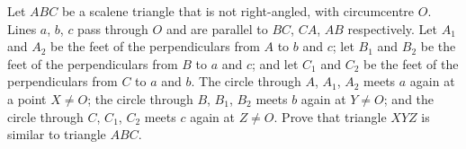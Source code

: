 Let $ABC$ be a scalene triangle that is not right-angled, with circumcentre $O$. Lines $a$, $b$, $c$ pass through $O$ and are parallel to $BC$, $CA$, $AB$ respectively. Let $A_1$ and $A_2$ be the feet of the perpendiculars from $A$ to $b$ and $c$; let $B_1$ and $B_2$ be the feet of the perpendiculars from $B$ to $a$ and $c$; and let $C_1$ and $C_2$ be the feet of the perpendiculars from $C$ to $a$ and $b$. The circle through $A$, $A_1$, $A_2$ meets $a$ again at a point $X\ne O$; the circle through $B$, $B_1$, $B_2$ meets $b$ again at $Y\ne O$; and the circle through $C$, $C_1$, $C_2$ meets $c$ again at $Z\ne O$. Prove that triangle $XYZ$ is similar to triangle $ABC$.
